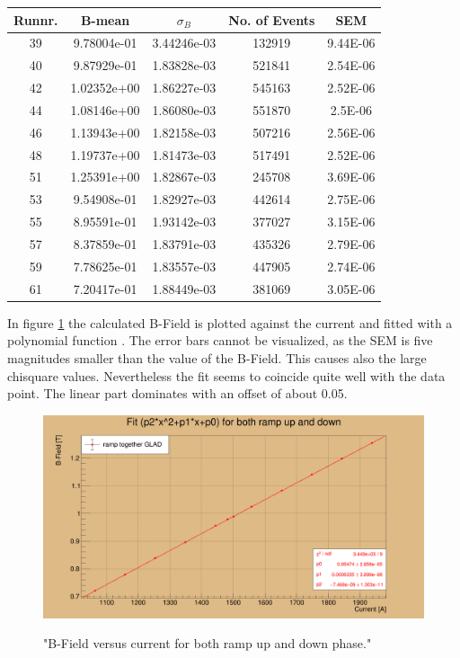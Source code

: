 \documentclass[12pt, letterpaper]{article}
\begin{document}
\begin{tabular}{|c|c|c|c|c|}
\hline
Runnr. & B-mean & $\sigma_{B}$ & No. of Events & SEM \\
\hline
39		&	9.78004e-01 &	3.44246e-03	&	132919	& 9.44E-06 \\
40		&	9.87929e-01	&	1.83828e-03	&	521841	& 2.54E-06 \\
42		&	1.02352e+00	&	1.86227e-03	&	545163	& 2.52E-06 \\
44		& 	1.08146e+00	&	1.86080e-03 &	551870	& 2.5E-06\\
46		&	1.13943e+00	&	1.82158e-03	& 	507216	& 2.56E-06\\
48		&	1.19737e+00	&	1.81473e-03	&	517491	& 2.52E-06\\
51		&	1.25391e+00 &	1.82867e-03	&	245708	& 3.69E-06\\
53		&	9.54908e-01	&	1.82927e-03	&	442614	& 2.75E-06\\
55		&	8.95591e-01	&	1.93142e-03	&	377027	& 3.15E-06\\
57		& 	8.37859e-01	&	1.83791e-03	&	435326	& 2.79E-06\\
59		&   7.78625e-01	&	1.83557e-03	&	447905	& 2.74E-06\\
61		&	7.20417e-01	&	1.88449e-03	&	381069	& 3.05E-06\\

\hline

\end{tabular}
\newline
In figure \ref{fig:together} the calculated B-Field is plotted against the current and fitted with a polynomial function . The error bars cannot be visualized, as the SEM is five magnitudes smaller than the value of the B-Field. This causes also the large chi\textunderscore square values. Nevertheless the fit seems to coincide quite well with the data point. The linear part dominates with an offset of about 0.05.

\begin{figure}[!htbp]
	\centering
	\includegraphics[width=.9\linewidth]{glad_pol2_fit_together.png}
	\label{fig:together}
	\caption{"B-Field versus current for both ramp up and down phase."}
\end{figure}
\end{document}
